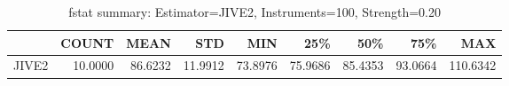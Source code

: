 \begin{table}[ht]
\centering
\caption{fstat summary: Estimator=JIVE2, Instruments=100, Strength=0.20}
\begin{tabular}{lrrrrrrrr}
\toprule
 & COUNT & MEAN & STD & MIN & 25\% & 50\% & 75\% & MAX \\
\midrule
JIVE2 & 10.0000 & 86.6232 & 11.9912 & 73.8976 & 75.9686 & 85.4353 & 93.0664 & 110.6342 \\
\bottomrule
\end{tabular}
\end{table}
